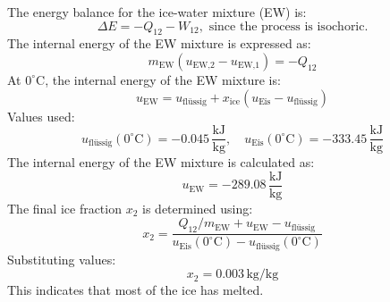 The energy balance for the ice-water mixture (EW) is:  
\[
\Delta E = -Q_{12} - W_{12}, \text{ since the process is isochoric.}
\]  
The internal energy of the EW mixture is expressed as:  
\[
m_{\text{EW}} (u_{\text{EW,2}} - u_{\text{EW,1}}) = -Q_{12}
\]  
At \( 0^\circ\text{C} \), the internal energy of the EW mixture is:  
\[
u_{\text{EW}} = u_{\text{flüssig}} + x_{\text{ice}} (u_{\text{Eis}} - u_{\text{flüssig}})
\]  
Values used:  
\[
u_{\text{flüssig}}(0^\circ\text{C}) = -0.045 \, \frac{\text{kJ}}{\text{kg}}, \quad u_{\text{Eis}}(0^\circ\text{C}) = -333.45 \, \frac{\text{kJ}}{\text{kg}}
\]  
The internal energy of the EW mixture is calculated as:  
\[
u_{\text{EW}} = -289.08 \, \frac{\text{kJ}}{\text{kg}}
\]  
The final ice fraction \( x_2 \) is determined using:  
\[
x_2 = \frac{Q_{12} / m_{\text{EW}} + u_{\text{EW}} - u_{\text{flüssig}}}{u_{\text{Eis}}(0^\circ\text{C}) - u_{\text{flüssig}}(0^\circ\text{C})}
\]  
Substituting values:  
\[
x_2 = 0.003 \, \text{kg/kg}
\]  
This indicates that most of the ice has melted.